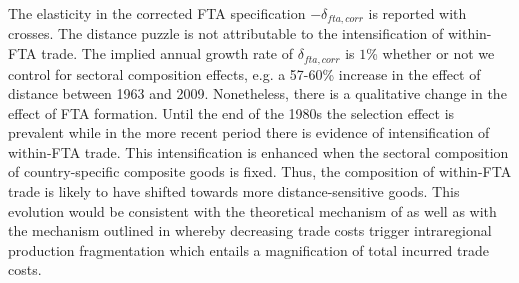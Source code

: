 \documentclass[12pt,twoside,a4paper,notitlepage]{article}
\begin{document}
The elasticity in the corrected FTA specification $-\delta_{fta,corr}$ is reported with crosses. The distance puzzle is not attributable to the intensification of within-FTA trade. The implied annual growth rate of $\delta_{fta,corr}$ is $1$\% whether or not we control for sectoral composition effects, e.g. a 57-60\% increase in the effect of distance between 1963 and 2009. Nonetheless, there is a qualitative change in the effect of FTA formation. Until the end of the 1980s the selection effect is prevalent while in the more recent period there is evidence of intensification of within-FTA trade. This intensification is enhanced when the sectoral composition of country-specific composite goods is fixed. Thus, the composition of within-FTA trade is likely to have shifted towards more distance-sensitive goods. This evolution would be consistent with the theoretical mechanism of \cite{Duranton2008} as well as with the mechanism outlined in \cite{Yi2010} whereby decreasing trade costs trigger intraregional production fragmentation which entails a magnification of total incurred trade costs.
\end{document}
